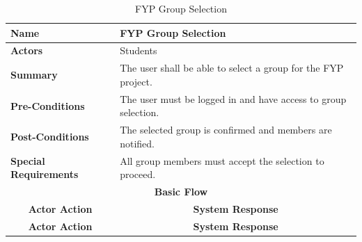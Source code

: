 \documentclass{FastFyp}
\begin{document}
\begin{longtable}{|lllll|}
\caption{FYP Group Selection} \label{tab:fyp-group-selection} \\ \hline
\multicolumn{2}{|l|}{\textbf{Name}} &
  \multicolumn{3}{l|}{FYP Group Selection} \\ \hline
\multicolumn{2}{|l|}{\textbf{Actors}} &
  \multicolumn{3}{l|}{Students} \\ \hline
\multicolumn{2}{|l|}{\textbf{Summary}} &
  \multicolumn{3}{l|}{The user shall be able to select a group for the FYP project.} \\ \hline
\multicolumn{2}{|l|}{\textbf{Pre-Conditions}} &
  \multicolumn{3}{l|}{The user must be logged in and have access to group selection.} \\ \hline
\multicolumn{2}{|l|}{\textbf{Post-Conditions}} &
  \multicolumn{3}{l|}{The selected group is confirmed and members are notified.} \\ \hline
\multicolumn{2}{|l|}{\textbf{Special Requirements}} &
  \multicolumn{3}{l|}{All group members must accept the selection to proceed.} \\ \hline
\multicolumn{5}{|c|}{\textbf{Basic Flow}} \\ \hline
\multicolumn{3}{|c|}{\textbf{Actor Action}} &
  \multicolumn{2}{c|}{\textbf{System Response}} \\ \hline
\endfirsthead %
\hline
\multicolumn{3}{|c|}{\textbf{Actor Action}} &
  \multicolumn{2}{c|}{\textbf{System Response}} \\ \hline
\endhead %


\end{longtable}
\end{document}
